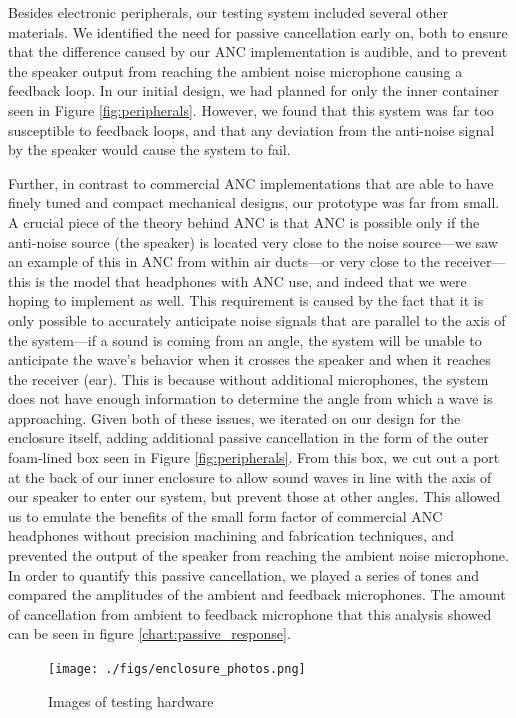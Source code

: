 \documentclass{fpgairpods}
\begin{document}
Besides electronic peripherals, our testing system included several other materials. We identified the need for passive cancellation early on, both to ensure that the difference caused by our ANC implementation is audible, and to prevent the speaker output from reaching the ambient noise microphone causing a feedback loop. In our initial design, we had planned for only the inner container seen in Figure \ref{fig:peripherals}. However, we found that this system was far too susceptible to feedback loops, and that any deviation from the anti-noise signal by the speaker would cause the system to fail.

Further, in contrast to commercial ANC implementations that are able to have finely tuned and compact mechanical designs, our prototype was far from small. A crucial piece of the theory behind ANC is that ANC is possible only if the anti-noise source (the speaker) is located very close to the noise source---we saw an example of this in ANC from within air ducts---or very close to the receiver---this is the model that headphones with ANC use, and indeed that we were hoping to implement as well. This requirement is caused by the fact that it is only possible to accurately anticipate noise signals that are parallel to the axis of the system---if a sound is coming from an angle, the system will be unable to anticipate the wave's behavior when it crosses the speaker and when it reaches the receiver (ear). This is because without additional microphones, the system does not have enough information to determine the angle from which a wave is approaching. Given both of these issues, we iterated on our design for the enclosure itself, adding additional passive cancellation in the form of the outer foam-lined box seen in Figure \ref{fig:peripherals}. From this box, we cut out a port at the back of our inner enclosure to allow sound waves in line with the axis of our speaker to enter our system, but prevent those at other angles. This allowed us to emulate the benefits of the small form factor of commercial ANC headphones without precision machining and fabrication techniques, and prevented the output of the speaker from reaching the ambient noise microphone. In order to quantify this passive cancellation, we played a series of tones and compared the amplitudes of the ambient and feedback microphones. The amount of cancellation from ambient to feedback microphone that this analysis showed can be seen in figure \ref{chart:passive_response}.

\begin{figure}
\centering
\texttt{[image: ./figs/enclosure\_photos.png]}
\caption{Images of testing hardware}
\label{fig:systempics}
\end{figure}
\end{document}
